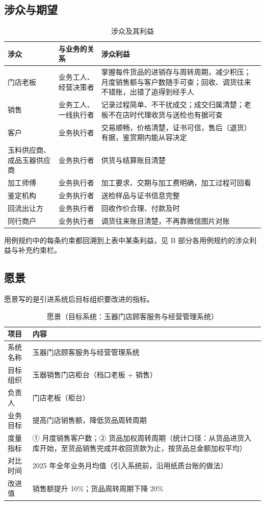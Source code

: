 \documentclass[12pt, a4paper]{ctexart}
\begin{document}
\subsection{涉众与期望}

\begin{table}[H]
\centering
\caption{涉众及其利益}
\begin{tabularx}{\textwidth}{@{}l l X@{}}
\toprule
涉众 & 与业务的关系 & 涉众利益 \\
\midrule
门店老板 & 业务工人、经营决策者 & 掌握每件货品的进销存与周转周期，减少积压；月度销售额与客户数随手可查；回收、调货往来不错账，出错了追得到经手人 \\
销售 & 业务工人、一线执行者 & 记录过程简单、不干扰成交；成交归属清楚；老板不在店时代理收货与送检也有据可查 \\
客户 & 业务执行者 & 交易顺畅，价格清楚，证书可信，售后（退货）有据，鉴赏期内能从容决定 \\
玉料供应商、成品玉器供应商 & 业务执行者 & 供货与结算账目清楚 \\
加工师傅 & 业务执行者 & 加工要求、交期与加工费明确，加工过程可回看 \\
鉴定机构 & 业务执行者 & 送检样品与证书信息完整 \\
回流出让方 & 业务执行者 & 回收作价合理、付款及时 \\
同行商户 & 业务执行者 & 调货往来账目清楚，不再靠微信图片对账 \\
\bottomrule
\end{tabularx}
\end{table}

\noindent
用例规约中的每条约束都回溯到上表中某条利益，见 B 部分各用例规约的涉众利益与补充约束栏。

\subsection{愿景}

愿景写的是引进系统后目标组织要改进的指标。

\begin{table}[H]
\centering
\caption{愿景（目标系统：玉器门店顾客服务与经营管理系统）}
\begin{tabularx}{\textwidth}{@{}p{2.6cm} X@{}}
\toprule
项目 & 内容 \\
\midrule
系统名称 & 玉器门店顾客服务与经营管理系统 \\
目标组织 & 玉器销售门店柜台（档口老板 + 销售） \\
负责人 & 门店老板（柜台） \\
业务目标 & 提高门店销售额，降低货品周转周期 \\
度量指标 & ① 月度销售客户数；② 货品加权周转周期（统计口径：从货品进货入库开始，至货品销售完成并收回货款为止，按货品总金额加权平均） \\
对比时间 & 2025 年全年业务月均值（引入系统前，沿用纸质台账的做法） \\
改进值 & 销售额提升 10\%；货品周转周期下降 20\% \\
\bottomrule
\end{tabularx}
\end{table}
\end{document}
